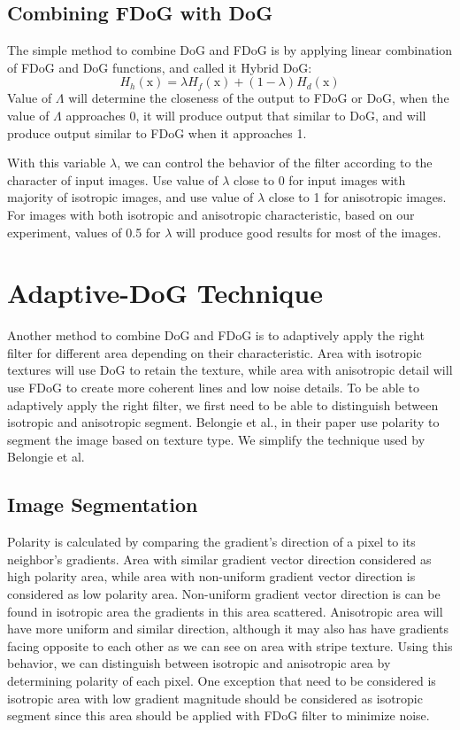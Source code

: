 \section{Combining FDoG with DoG}
The simple method to combine DoG and FDoG is by applying linear combination of FDoG and DoG functions, and called it Hybrid DoG:
\begin{equation}
	H_{h}(\mbox{x}) = \lambda H_{f}(\mbox{x}) + (1 - \lambda) H_{d}(\mbox{x})
\end{equation}
Value of $\Lambda$ will determine the closeness of the output to FDoG or DoG, when the value of $\Lambda$ approaches 0, it will produce output that similar to DoG, and will produce output similar to FDoG when it approaches 1. 

With this variable $\lambda$, we can control the behavior of the filter according to the character of input images. Use value of $\lambda$ close to 0 for input images with majority of isotropic images, and use value of $\lambda$ close to 1 for anisotropic images. For images with both isotropic and anisotropic characteristic, based on our experiment, values of 0.5 for $\lambda$ will produce good results for most of the images.

\chapter{Adaptive-DoG Technique}
Another method to combine DoG and FDoG is to adaptively apply the right filter for different area depending on their characteristic. Area with isotropic textures will use DoG to retain the texture, while area with anisotropic detail will use FDoG to create more coherent lines and low noise details. To be able to adaptively apply the right filter, we first need to be able to distinguish between isotropic and anisotropic segment. Belongie et al., \cite{belongie98} in their paper use polarity to segment the image based on texture type. We simplify the technique used by Belongie et al.

\section{Image Segmentation} 
Polarity is calculated by comparing the gradient's direction of a pixel to its neighbor's gradients. Area with similar gradient vector direction considered as high polarity area, while area with non-uniform gradient vector direction is considered as low polarity area. Non-uniform gradient vector direction is can be found in isotropic area the gradients in this area scattered. Anisotropic area will have more uniform and similar direction, although it may also has have gradients facing opposite to each other as we can see on area with stripe texture. Using this behavior, we can distinguish between isotropic and anisotropic area by determining polarity of each pixel. One exception that need to be considered is isotropic area with low gradient magnitude should be considered as isotropic segment since this area should be applied with FDoG filter to minimize noise.

